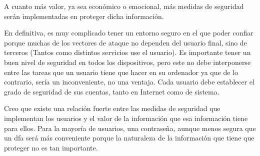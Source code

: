 \documentclass[titlepage, 12pt, a4paper]{article}
\begin{document}
A cuanto más valor, ya sea económico o emocional, más medidas de seguridad serán implementadas en proteger dicha información.\par En definitiva, es muy complicado tener un entorno seguro en el que poder confiar porque muchas de los vectores de ataque no dependen del usuario final, sino de terceros (Tantos como distintos servicios use el usuario). Es importante tener un buen nivel de seguridad en todos los dispositivos, pero este no debe interponerse entre las tareas que un usuario tiene que hacer en su ordenador ya que de lo contrario, sería un inconveniente, no una ventaja. Cada usuario debe establecer el grado de seguridad de sus cuentas, tanto en Internet como de sistema.\par Creo que existe una relación fuerte entre las medidas de seguridad que implementan los usuarios y el valor de la información que esa información tiene para ellos. Para la mayoría de usuarios, una contraseña, aunque menos segura que un \Gls{dfa} será más conveniente porque la naturaleza de la información que tiene que proteger no es tan importante.
\end{document}
